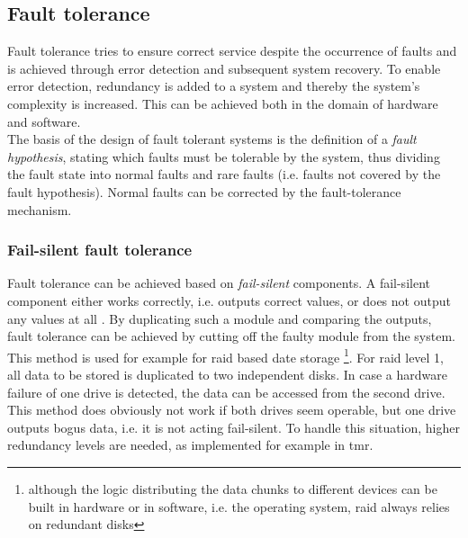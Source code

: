 \subsection{Fault tolerance}
Fault tolerance tries to ensure correct service despite the occurrence of faults and is achieved through error detection and subsequent system recovery.
To enable error detection, redundancy is added to a system and thereby the 
system's complexity is increased. This can be achieved both in the domain of hardware and software. 
\\
The basis of the design of fault tolerant systems is the definition of a \textit{fault hypothesis}, stating which faults must be tolerable by the system, thus
dividing the fault state into normal faults and rare faults (i.e. faults not covered by the fault hypothesis). Normal faults can be corrected by the fault-tolerance
mechanism. 

\subsubsection{Fail-silent fault tolerance}
Fault tolerance can be achieved based on \textit{fail-silent} components. A fail-silent component
either works correctly, i.e. outputs correct values, or does not output any values at all \cite{544479}. By duplicating such a module and comparing the
outputs, fault tolerance can be achieved by cutting off the faulty module from the system.
\\
This method is used for example for \gls{raid} based date storage \footnote{although the logic distributing
the data chunks to different devices can be built in hardware or in software, i.e. the operating system, \gls{raid} always relies on redundant disks}.
For \gls{raid} level 1, all data to be stored is duplicated to two independent disks. In case a hardware failure of one drive is detected, the data can be accessed
from the second drive. This method does obviously not work if both drives seem operable, but one drive outputs bogus data, i.e. it is not acting fail-silent.
To handle this situation, higher redundancy levels are needed, as implemented for example in \gls{tmr}. 

